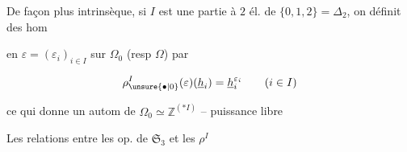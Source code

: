  De façon plus intrinsèque, si $I$ est une partie à $2$ él.  de $\{0,1,2\}=\Delta_2$, on définit des hom


en  $\varepsilon=(\varepsilon_i)_{i\in I}$ sur $\Omega_0$ (resp $\Omega$) par 

\[
 \rho^I_{\unsure{\bullet|0}}(\varepsilon)(\underline h_i)=\underline h_i^{\varepsilon_i}\qquad(i\in I)
\]

 ce qui donne un autom de $\Omega_0\simeq\mathbb Z^{(*I)}$ -- puissance libre

Les relations entre les op. de $\mathfrak S_3$ et les $\rho^I$
